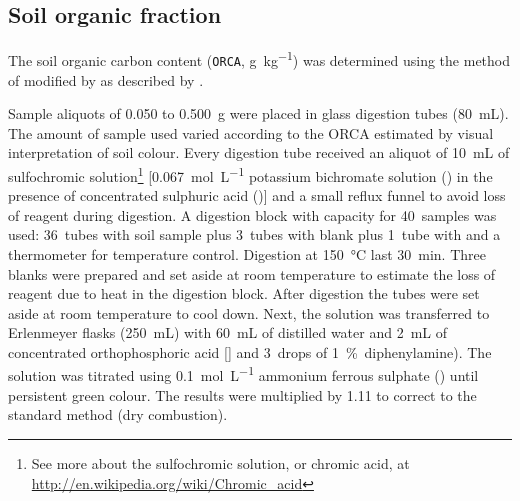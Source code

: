 \tocless\subsection{Soil organic fraction}
\label{apen:soil-data-orca}

The soil organic carbon content (\texttt{ORCA}, \si{\gram\per\kilo\gram}) was determined using the method of
 modified by  as described by
.

Sample aliquots of \num{0.050} to \SI{0.500}{\gram} were placed in glass digestion tubes 
(\SI{80}{\milli\liter}). The amount of sample used varied according to the ORCA estimated by visual 
interpretation of soil colour. Every digestion tube received an aliquot of \SI{10}{\milli\liter} of 
sulfochromic solution\footnote{See more about the sulfochromic solution, or chromic acid, at
\url{http://en.wikipedia.org/wiki/Chromic_acid}} [\SI{0.067}{\mole\per\liter} potassium bichromate solution
() in the presence of concentrated sulphuric acid ()] and a small reflux funnel 
to avoid loss of reagent during digestion. A digestion block with capacity for \num{40}~samples was used:
\num{36}~tubes with soil sample plus \num{3}~tubes with blank plus \num{1}~tube with  and a
thermometer for temperature control. Digestion at \SI{150}{\celsius} last \SI{30}{\minute}. Three blanks 
were prepared and set aside at room temperature to estimate the loss of reagent due to heat in the digestion 
block. After digestion the tubes were set aside at room temperature to cool down. Next, the solution was 
transferred to Erlenmeyer flasks (\SI{250}{\milli\liter}) with \SI{60}{\milli\liter} of distilled water and
\SI{2}{\milli\liter} of concentrated orthophosphoric acid [] and \num{3}~drops of 
\SI{1}{\percent}~diphenylamine). The solution was titrated using \SI{0.1}{\mole\per\liter} ammonium ferrous
sulphate () until persistent green colour. The results were multiplied by \num{1.11}
to correct to the standard method (dry combustion).

